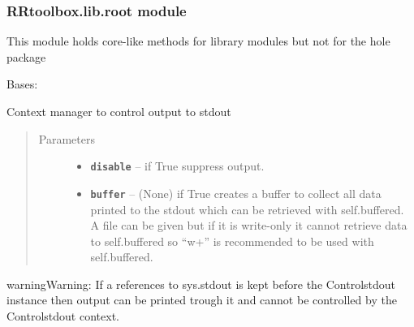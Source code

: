 \documentclass[letterpaper,10pt,english]{sphinxmanual}
\begin{document}
\subsubsection{RRtoolbox.lib.root module}
\label{RRtoolbox.lib:rrtoolbox-lib-root-module}\label{RRtoolbox.lib:module-RRtoolbox.lib.root}
This module holds core-like methods for library modules but not for the hole package

\begin{fulllineitems}
\label{RRtoolbox.lib:RRtoolbox.lib.root.Controlstdout}
Bases: 

Context manager to control output to stdout
\begin{quote}\begin{description}
\item[{Parameters}] \leavevmode\begin{itemize}
\item {} 
\textbf{\texttt{disable}} -- if True suppress output.

\item {} 
\textbf{\texttt{buffer}} -- (None) if True creates a buffer to collect all data
printed to the stdout which can be retrieved with self.buffered.
A file can be given but if it is write-only it cannot retrieve
data to self.buffered so ``w+'' is recommended to be used with self.buffered.

\end{itemize}

\end{description}\end{quote}

\begin{notice}{warning}{Warning:}
If a references to sys.stdout is kept before the Controlstdout
instance then output can be printed trough it and cannot be
controlled by the Controlstdout context.
\end{notice}

\end{fulllineitems}

\end{document}
